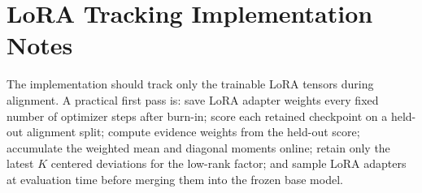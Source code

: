 \documentclass[10pt]{article}
\theoremstyle{plain}
\theoremstyle{definition}
\theoremstyle{remark}
\begin{document}
\section{LoRA Tracking Implementation Notes}

The implementation should track only the trainable LoRA tensors during alignment. A practical first pass is: save LoRA adapter weights every fixed number of optimizer steps after burn-in; score each retained checkpoint on a held-out alignment split; compute evidence weights from the held-out score; accumulate the weighted mean and diagonal moments online; retain only the latest $K$ centered deviations for the low-rank factor; and sample LoRA adapters at evaluation time before merging them into the frozen base model.



\end{document}
